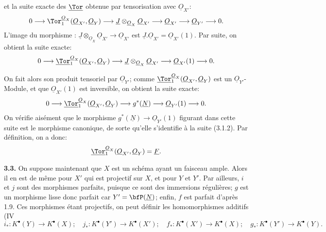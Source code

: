 
et la
suite exacte des \(\underline{\Tor}\) obtenue par tensorisation avec \(\underline{O}_{X'}\):
\[
0\longrightarrow
\Tor_1^{\underline{O}_X}(\underline{O}_{X'},\underline{O}_Y)
\longrightarrow
\underline{J}\otimes_{\underline{O}_X}\underline{O}_{X'}
\longrightarrow
\underline{O}_{X'}
\longrightarrow
\underline{O}_{Y'}
\longrightarrow0.
\]
L'image du morphisme : \(\underline{J}\otimes_{\underline{O}_X}\underline{O}_{X'}\to\underline{O}_{X'}\) est
\(\underline{J}.\underline{O}_{X'}=\underline{O}_{X'}(1)\). Par suite, on obtient la suite exacte:
\[
0\longrightarrow
\underline{\Tor}_1^{\underline{O}_X}(\underline{O}_{X'},\underline{O}_Y)
\longrightarrow
\underline{J}\otimes_{\underline{O}_X}\underline{O}_{X'}
\longrightarrow
\underline{O}_{X'}(1)
\longrightarrow0.
\]

On fait alors son produit tensoriel par \(\underline{O}_{Y'}\); comme
\(\underline{\Tor}_1^{\underline{O}_X}(\underline{O}_{X'},\underline{O}_Y)\) est un \(\underline{O}_{Y'}\)-Module, et que
\(\underline{O}_{X'}(1)\) est inversible, on obtient la suite exacte:
\[
0\longrightarrow
\underline{\Tor}_1^{\underline{O}_X}(\underline{O}_{X'},\underline{O}_Y)
\longrightarrow
g^*(\underline{N})
\longrightarrow
\underline{O}_{Y'}(1)
\longrightarrow0.
\]
On vérifie aisément que le morphisme \(g^*(\underline{N})\to\underline{O}_{Y'}(1)\) figurant dans cette suite est le morphisme canonique, de sorte qu'elle s'identifie à la suite (3.1.2). Par définition, on a donc:
\[
\underline{\Tor}_1^{\underline{O}_X}(\underline{O}_{X'},\underline{O}_Y)=\underline{F}.
\]

\textbf{3.3.} On suppose maintenant que \(X\) est un schéma ayant un faisceau ample. Alors il en est de même pour \(X'\) qui est projectif sur \(X\), et pour \(Y\) et \(Y'\). Par ailleurs, \(i\) et \(j\) sont des morphismes parfaits, puisque ce sont des immersions régulières; \(g\) est un morphisme lisse donc parfait car \(Y'=\bfP(\underline{N})\); enfin, \(f\) est parfait d'après 1.9. Ces morphismes étant projectifs, on peut définir les homomorphismes additifs (IV
\[
i_*:K^{\bullet}(Y)\to K^{\bullet}(X);\quad
j_*:K^{\bullet}(Y')\to K^{\bullet}(X');\quad
f_*:K^{\bullet}(X')\to K^{\bullet}(X);\quad
g_*:K^{\bullet}(Y')\to K^{\bullet}(Y).
\]

